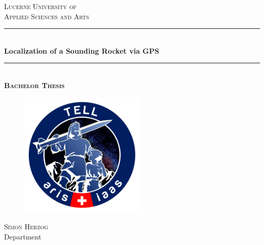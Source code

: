 
\begin{titlepage} %
	\newcommand{\HRule}{\rule{\linewidth}{0.5mm}} %
	
	\center %
	
	\textsc{\large Lucerne University of\\ Applied Sciences and Arts}\\[0.2cm] %
	
	
	\HRule\\[0.4cm]
	
	{\LARGE\bfseries Localization of a Sounding Rocket via GPS}\\[0.4cm] %
	
	\HRule\\[0.5cm]
	
	\large \textsc{\textbf{Bachelor Thesis}}\\[0.5cm] 
	
	\vfill
	
	\begin{figure}[!h]
	  \centering
	  \includegraphics[height=6cm]{images/Tell_Logo.png}
	\end{figure}
	
	\vfill
	
	\textsc{\normalsize Simon Herzog}\\[0.3cm]
	
	{\normalsize Department}\\
	

\end{titlepage}
